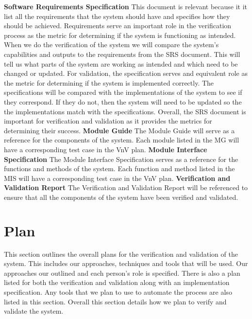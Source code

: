 \documentclass[12pt, titlepage]{article}
\begin{document}
\noindent \textbf{Software Requirements Specification} \citet{SRS}
\newline
This document is relevant because it it list all the requirements that the system should have and specifies how they should be achieved.
Requirements serve an important role in the verification process as the metric for determining if the system is functioning as intended.
When we do the verification of the system we will compare the system's capabilities and outputs to the requirements from the SRS document.
This will tell us what parts of the system are working as intended and which need to be changed or updated.
For validation, the specification serves and equivalent role as the metric for determining if the system is implemented correctly.
The specifications will be compared with the implementations of the system to see if they correspond.
If they do not, then the system will need to be updated so the the implementations match with the specifications.
Overall, the SRS document is important for verification and validation as it provides the metrics for determining their success.
\bigskip
\newline
\textbf{Module Guide}
\newline
The Module Guide will serve as a reference for the components of the system.
Each module listed in the MG will have a corresponding test case in the VnV plan.
\bigskip
\newline
\textbf{Module Interface Specification}
\newline
The Module Interface Specification serves as a reference for the functions and methods of the system.
Each function and method listed in the MIS will have a corresponding test case in the VnV plan.
\bigskip
\newline
\textbf{Verification and Validation Report}
\newline
The Verification and Validation Report will be referenced to ensure that all the components of the system have been verified and validated.


\section{Plan}


This section outlines the overall plans for the verification and validation of the system.
This includes our approaches, techniques and tools that will be used.
Our approaches our outlined and each person's role is specified.
There is also a plan listed for both the verification and validation along with an implementation specification.
Any tools that we plan to use to automate the process are also listed in this section.
Overall this section details how we plan to verify and validate the system.
\end{document}
